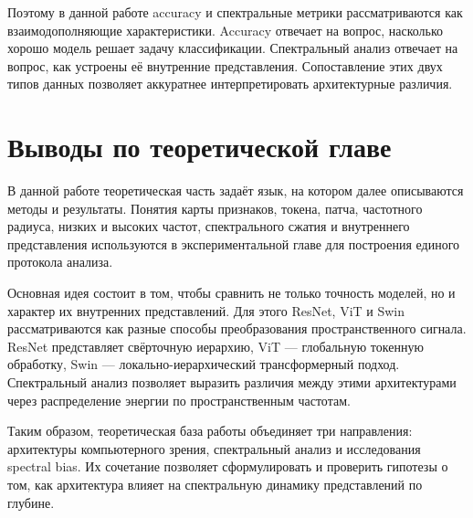 Поэтому в данной работе accuracy и спектральные метрики рассматриваются как взаимодополняющие характеристики. Accuracy отвечает на вопрос, насколько хорошо модель решает задачу классификации. Спектральный анализ отвечает на вопрос, как устроены её внутренние представления. Сопоставление этих двух типов данных позволяет аккуратнее интерпретировать архитектурные различия.


\section{Выводы по теоретической главе}

В данной работе теоретическая часть задаёт язык, на котором далее описываются методы и результаты. Понятия карты признаков, токена, патча, частотного радиуса, низких и высоких частот, спектрального сжатия и внутреннего представления используются в экспериментальной главе для построения единого протокола анализа.

Основная идея состоит в том, чтобы сравнить не только точность моделей, но и характер их внутренних представлений. Для этого ResNet, ViT и Swin рассматриваются как разные способы преобразования пространственного сигнала. ResNet представляет свёрточную иерархию, ViT — глобальную токенную обработку, Swin — локально-иерархический трансформерный подход. Спектральный анализ позволяет выразить различия между этими архитектурами через распределение энергии по пространственным частотам.

Таким образом, теоретическая база работы объединяет три направления: архитектуры компьютерного зрения, спектральный анализ и исследования spectral bias. Их сочетание позволяет сформулировать и проверить гипотезы о том, как архитектура влияет на спектральную динамику представлений по глубине.
